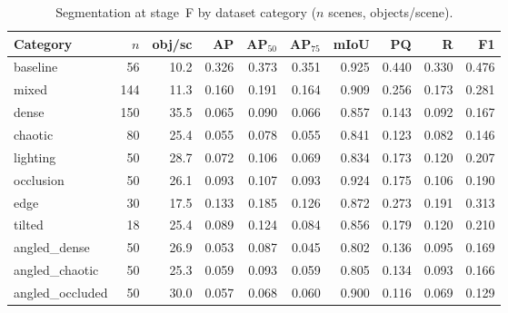 \begin{table}[t]
\centering
\caption{Segmentation at stage~F by dataset category ($n$ scenes, objects/scene).}
\label{tab:exp1-per-category}
\begin{tabular}{lrrrrrrrrr}
\toprule
Category & $n$ & obj/sc & AP & AP$_{50}$ & AP$_{75}$ & mIoU & PQ & R & F1 \\
\midrule
baseline & 56 & 10.2 & 0.326 & 0.373 & 0.351 & 0.925 & 0.440 & 0.330 & 0.476 \\
mixed & 144 & 11.3 & 0.160 & 0.191 & 0.164 & 0.909 & 0.256 & 0.173 & 0.281 \\
dense & 150 & 35.5 & 0.065 & 0.090 & 0.066 & 0.857 & 0.143 & 0.092 & 0.167 \\
chaotic & 80 & 25.4 & 0.055 & 0.078 & 0.055 & 0.841 & 0.123 & 0.082 & 0.146 \\
lighting & 50 & 28.7 & 0.072 & 0.106 & 0.069 & 0.834 & 0.173 & 0.120 & 0.207 \\
occlusion & 50 & 26.1 & 0.093 & 0.107 & 0.093 & 0.924 & 0.175 & 0.106 & 0.190 \\
edge\footnotemark & 30 & 17.5 & 0.133 & 0.185 & 0.126 & 0.872 & 0.273 & 0.191 & 0.313 \\
tilted\footnotemark & 18 & 25.4 & 0.089 & 0.124 & 0.084 & 0.856 & 0.179 & 0.120 & 0.210 \\
angled_dense & 50 & 26.9 & 0.053 & 0.087 & 0.045 & 0.802 & 0.136 & 0.095 & 0.169 \\
angled_chaotic & 50 & 25.3 & 0.059 & 0.093 & 0.059 & 0.805 & 0.134 & 0.093 & 0.166 \\
angled_occluded & 50 & 30.0 & 0.057 & 0.068 & 0.060 & 0.900 & 0.116 & 0.069 & 0.129 \\
\bottomrule
\end{tabular}
\end{table}